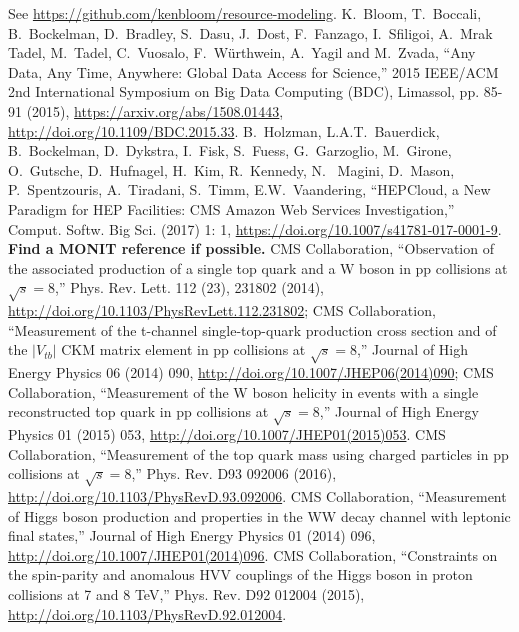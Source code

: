 \begin{thebibliography}{99}
%
%
  See
  \url{https://github.com/kenbloom/resource-modeling}.
 K.~Bloom, T.~Boccali, B.~Bockelman, D.~Bradley, S.~Dasu,
  J.~Dost, F.~Fanzago, I.~Sfiligoi, A.~Mrak Tadel, M.~Tadel, C.~Vuosalo,
  F.~W{\"u}rthwein, A.~Yagil and M.~Zvada, ``Any Data, Any Time, Anywhere:
  Global Data Access for Science,'' 2015 IEEE/ACM 2nd International
  Symposium on Big Data Computing (BDC), Limassol, pp. 85-91 (2015),
  \url{https://arxiv.org/abs/1508.01443}, \url{http://doi.org/10.1109/BDC.2015.33}.
%
 B.~Holzman, L.A.T.~Bauerdick, B.~Bockelman, D.~Dykstra, I.~Fisk, S.~Fuess, G.~Garzoglio, M.~Girone, O.~Gutsche, D.~Hufnagel, H.~Kim, R.~Kennedy, N.~ Magini, D.~Mason, P.~Spentzouris, A.~Tiradani, S.~Timm, E.W.~Vaandering, ``HEPCloud, a New Paradigm for HEP Facilities: CMS Amazon Web Services Investigation,''
Comput. Softw. Big Sci. (2017) 1: 1, \url{https://doi.org/10.1007/s41781-017-0001-9}.
%
 {\bf Find a MONIT reference if possible.}
%
%
CMS Collaboration, ``Observation of the associated production of a single top quark and a W boson in pp collisions at $\sqrt{s}=$8\TeV,'' Phys. Rev. Lett. 112 (23), 231802 (2014), \url{http://doi.org/10.1103/PhysRevLett.112.231802};
%
CMS Collaboration, ``Measurement of the t-channel single-top-quark production cross section and of the $|V_{tb}|$ CKM matrix element in pp collisions at $\sqrt{s} = 8$\TeV,'' Journal of High Energy Physics 06 (2014) 090, \url{http://doi.org/10.1007/JHEP06(2014)090};
%
CMS Collaboration, ``Measurement of the W boson helicity in events with a
single reconstructed top quark in pp collisions at $\sqrt{s}=$8\TeV,''
Journal of High Energy Physics 01 (2015) 053,
\url{http://doi.org/10.1007/JHEP01(2015)053}.
%
 CMS Collaboration, ``Measurement of the top quark mass using charged
 particles in pp collisions at $\sqrt{s} = 8$\TeV,'' Phys. Rev.  D93 092006
 (2016), \url{http://doi.org/10.1103/PhysRevD.93.092006}. 
%
%
    CMS Collaboration, ``Measurement of Higgs boson production and properties in the WW decay channel with leptonic final states,''
    Journal of High Energy Physics 01 (2014) 096, \url{http://doi.org/10.1007/JHEP01(2014)096}.
%
  CMS Collaboration, ``Constraints on the spin-parity and anomalous HVV couplings of the Higgs boson in proton collisions at 7 and 8 TeV,''
  Phys. Rev. D92 012004 (2015), \url{http://doi.org/10.1103/PhysRevD.92.012004}.

\end{thebibliography}
